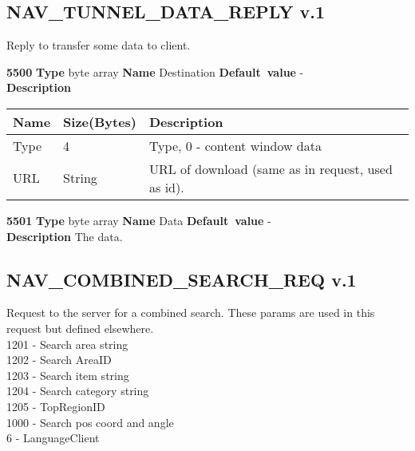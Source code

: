 \documentclass[a4paper]{article}
\begin{document}
\subsection{NAV\_TUNNEL\_DATA\_REPLY v.1}

Reply to transfer some data to client.

\begin{list}{\textbf{ParamID}}{}
\item \textbf{5500} \textbf{Type} byte array \textbf{Name} Destination
                 \textbf{Default~value} - \\
  \label{tunnel_rep:Destination}
  \textbf{Description} \\
  \begin{tabular}{|l|l|p{60mm}|}
    \hline
    Name    & Size(Bytes) & Description \\\hline
    Type    & 4           & Type, 0 - content window data \\\hline
    URL     & String      & URL of download (same as in request, used as id). \\ \hline
  \end{tabular}
\item \textbf{5501} \textbf{Type} byte array \textbf{Name} Data
                 \textbf{Default~value} - \\
  \label{tunnel_rep:Data}
  \textbf{Description} The data.
\end{list}

\subsection{NAV\_COMBINED\_SEARCH\_REQ v.1}
\label{NAV_COMBINED_SEARCH_REQ}

Request to the server for a combined search.
These params are used in this request but defined elsewhere.\\
1201 - Search area string \\
1202 - Search AreaID \\
1203 - Search item string \\
1204 - Search category string \\
1205 - TopRegionID \\
1000 - Search pos coord and angle\\
6 - LanguageClient
\end{document}
